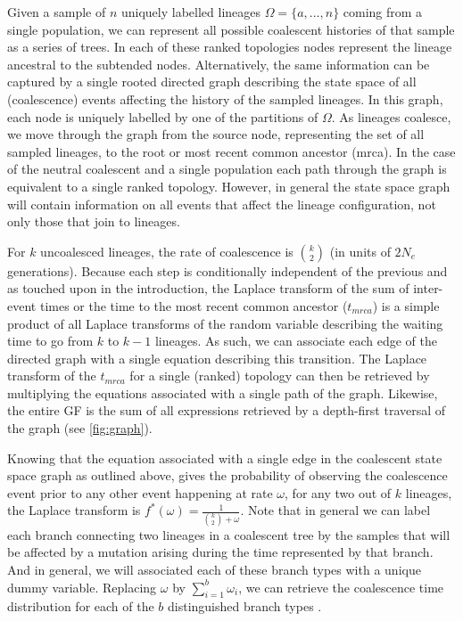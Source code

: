 \documentclass[10pt, a4]{article}
\begin{document}
Given a sample of $n$ uniquely labelled lineages $\Omega = \{a, ..., n\}$ coming from a single population, we can represent all possible coalescent histories of that sample as a series of trees. In each of these ranked topologies nodes represent the lineage ancestral to the subtended nodes. Alternatively, the same information can be captured by a single rooted directed graph describing the state space of all (coalescence) events affecting the history of the sampled lineages. In this graph, each node is uniquely labelled by one of the partitions of $\Omega$. As lineages coalesce, we move through the graph from the source node, representing the set of all sampled lineages, to the root or most recent common ancestor (mrca). In the case of the neutral coalescent and a single population each path through the graph is equivalent to a single ranked topology. However, in general the state space graph will contain information on all events that affect the lineage configuration, not only those that join to lineages. %

For $k$ uncoalesced lineages, the rate of coalescence is ${k}\choose{2}$ (in units of $2N_e$ generations). Because each step is conditionally independent of the previous and as touched upon in the introduction, the Laplace transform of the sum of inter-event times or the time to the most recent common ancestor ($t_{mrca}$) is a simple product of all Laplace transforms of the random variable describing the waiting time to go from $k$ to $k-1$ lineages. As such, we can associate each edge of the directed graph with a single equation describing this transition. The Laplace transform of the $t_{mrca}$ for a single (ranked) topology can then be retrieved by multiplying the equations associated with a single path of the graph. Likewise, the entire GF is the sum of all expressions retrieved by a depth-first traversal of the graph (see \ref{fig:graph}). %

Knowing that the equation associated with a single edge in the coalescent state space graph as outlined above, gives the probability of observing the coalescence event prior to any other event happening at rate $\omega$, for any two out of $k$ lineages, the Laplace transform is $f^{*}(\omega) = \frac{1}{{k\choose{2}} + \omega}$. Note that in general we can label each branch connecting two lineages in a coalescent tree by the samples that will be affected by a mutation arising during the time represented by that branch. And in general, we will associated each of these branch types with a unique dummy variable. Replacing $\omega$ by $\sum_{i=1}^{b} \omega_i$, we can retrieve the coalescence time distribution for each of the $b$ distinguished branch types \citep{Lohse2011}. 
\end{document}
